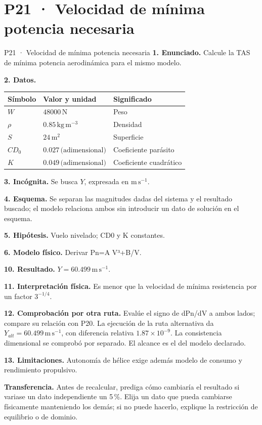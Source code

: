 \chapter*{P21 · Velocidad de mínima potencia necesaria}
\begin{studiumworked}{P21 · Velocidad de mínima potencia necesaria}
\textbf{1. Enunciado.} Calcule la TAS de mínima potencia aerodinámica para el mismo modelo.

\textbf{2. Datos.}
\begin{longtable}{p{.16\linewidth}p{.35\linewidth}p{.38\linewidth}}\toprule Símbolo & Valor y unidad & Significado\\\midrule\endhead
$W$ & $48000\,\mathrm N$ & Peso\\
$\rho$ & $0.85\,\mathrm{kg\,m^{-3}}$ & Densidad\\
$S$ & $24\,\mathrm{m^2}$ & Superficie\\
$CD_{0}$ & $0.027\,\text{(adimensional)}$ & Coeficiente parásito\\
$K$ & $0.049\,\text{(adimensional)}$ & Coeficiente cuadrático\\
\bottomrule\end{longtable}
\textbf{3. Incógnita.} Se busca $Y$, expresada en $\mathrm{m\,s^{-1}}$.

\textbf{4. Esquema.} Se separan las magnitudes dadas del sistema y el resultado buscado; el modelo relaciona ambos sin introducir un dato de solución en el esquema.

\textbf{5. Hipótesis.} Vuelo nivelado; CD0 y K constantes.

\textbf{6. Modelo físico.} Derivar Pn=A V³+B/V.


\textbf{10. Resultado.} $Y=60.499\,\mathrm{m\,s^{-1}}$.

\textbf{11. Interpretación física.} Es menor que la velocidad de mínima resistencia por un factor $3^{-1/4}$.

\textbf{12. Comprobación por otra ruta.} Evalúe el signo de dPn/dV a ambos lados; compare su relación con P20. La ejecución de la ruta alternativa da $Y_{alt}=60.499\,\mathrm{m\,s^{-1}}$, con diferencia relativa $1.87\times10^{-9}$. La consistencia dimensional se comprobó por separado. El alcance es el del modelo declarado.

\textbf{13. Limitaciones.} Autonomía de hélice exige además modelo de consumo y rendimiento propulsivo.

\textbf{Transferencia.} Antes de recalcular, prediga cómo cambiaría el resultado si variase un dato independiente un 5\,\%. Elija un dato que pueda cambiarse físicamente manteniendo los demás; si no puede hacerlo, explique la restricción de equilibrio o de dominio.\par
\end{studiumworked}
